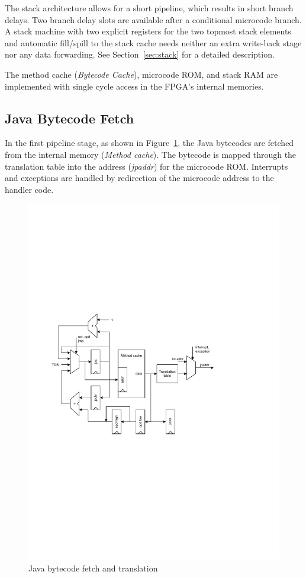 The stack architecture allows for a short pipeline, which results in
short branch delays. Two branch delay slots are available after a
conditional microcode branch. A stack machine with two explicit
registers for the two topmost stack elements and automatic
fill/spill to the stack cache needs neither an extra write-back
stage nor any data forwarding. See Section~\ref{sec:stack} for a
detailed description.

The method cache (\emph{Bytecode Cache}), microcode ROM, and stack
RAM are implemented with single cycle access in the FPGA's internal
memories.


\subsection{Java Bytecode Fetch}

In the first pipeline stage, as shown in
Figure~\ref{fig_arch_bc_fetch}, the Java bytecodes are fetched from
the internal memory (\emph{Method cache}). The bytecode is mapped
through the translation table into the address (\emph{jpaddr}) for
the microcode ROM. Interrupts and exceptions are handled by
redirection of the microcode address to the handler code.

\begin{figure}[t]
    \centering
    \includegraphics[scale=\picscale]{arch/arch_bcfetch}
    \caption{Java bytecode fetch and translation}
    \label{fig_arch_bc_fetch}
\end{figure}

